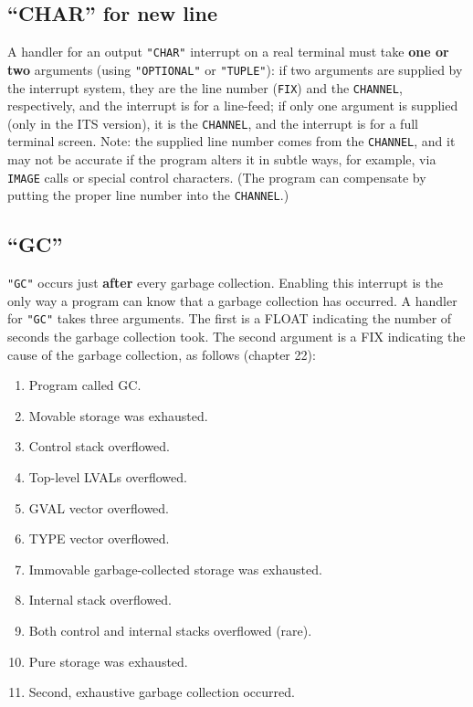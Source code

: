 \documentclass[a4paper]{scrbook}
\providecommand{\tightlist}{%
  \setlength{\itemsep}{0pt}\setlength{\parskip}{0pt}}
\begin{document}
\subsection{\texorpdfstring{``CHAR'' for new line}{21.8.3. CHAR for new line}}\label{char-for-new-line}

A handler for an output \texttt{"CHAR"} interrupt on a real terminal must take \textbf{one or two} arguments (using
\texttt{"OPTIONAL"} or \texttt{"TUPLE"}): if two arguments are supplied by the interrupt system, they are the line number
(\texttt{FIX}) and the \texttt{CHANNEL}, respectively, and the interrupt is for a line-feed; if only one argument is
supplied (only in the ITS version), it is the \texttt{CHANNEL}, and the interrupt is for a full terminal screen. Note: the
supplied line number comes from the \texttt{CHANNEL}, and it may not be accurate if the program alters it in subtle ways,
for example, via \texttt{IMAGE} calls or special control characters. (The program can compensate by
putting the proper line number into the \texttt{CHANNEL}.)

\subsection{\texorpdfstring{``GC''}{21.8.4. GC}}\label{gc}

\texttt{"GC"}  occurs just \textbf{after} every garbage collection. Enabling this interrupt
is the only way a program can know that a garbage collection has occurred. A handler for \texttt{"GC"} takes three
arguments. The first is a FLOAT indicating the number of seconds the garbage collection took. The second argument is a FIX
indicating the cause of the garbage collection, as follows (chapter 22):

\begin{enumerate}
\def\labelenumi{\arabic{enumi}.}
\setcounter{enumi}{-1}
\tightlist
\item
  Program called GC.
\item
  Movable storage was exhausted.
\item
  Control stack overflowed.
\item
  Top-level LVALs overflowed.
\item
  GVAL vector overflowed.
\item
  TYPE vector overflowed.
\item
  Immovable garbage-collected storage was exhausted.
\item
  Internal stack overflowed.
\item
  Both control and internal stacks overflowed (rare).
\item
  Pure storage was exhausted.
\item
  Second, exhaustive garbage collection occurred.
\end{enumerate}
\end{document}
